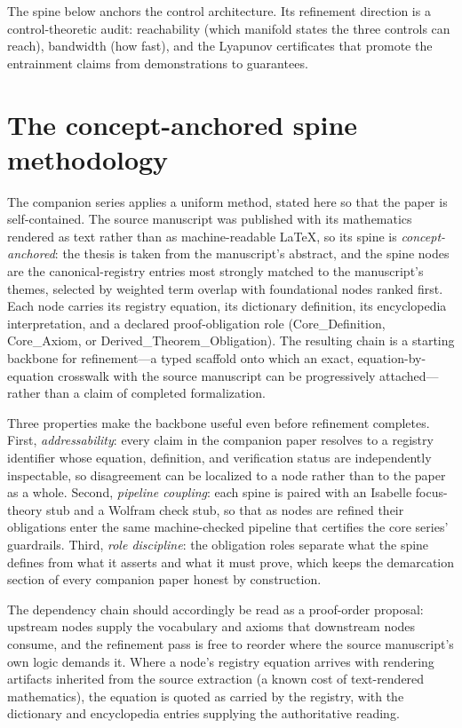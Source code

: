 \documentclass[11pt]{article}
\theoremstyle{remark}
\begin{document}
The spine below anchors the control architecture. Its refinement direction is a control-theoretic audit: reachability (which manifold states the three controls can reach), bandwidth (how fast), and the Lyapunov certificates that promote the entrainment claims from demonstrations to guarantees.

\section{The concept-anchored spine methodology}
\label{sec:method}

The companion series applies a uniform method, stated here so that the paper is self-contained. The source manuscript was published with its mathematics rendered as text rather than as machine-readable LaTeX, so its spine is \emph{concept-anchored}: the thesis is taken from the manuscript's abstract, and the spine nodes are the canonical-registry entries most strongly matched to the manuscript's themes, selected by weighted term overlap with foundational nodes ranked first. Each node carries its registry equation, its dictionary definition, its encyclopedia interpretation, and a declared proof-obligation role (Core\_Definition, Core\_Axiom, or Derived\_Theorem\_Obligation). The resulting chain is a starting backbone for refinement---a typed scaffold onto which an exact, equation-by-equation crosswalk with the source manuscript can be progressively attached---rather than a claim of completed formalization.

Three properties make the backbone useful even before refinement completes. First, \emph{addressability}: every claim in the companion paper resolves to a registry identifier whose equation, definition, and verification status are independently inspectable, so disagreement can be localized to a node rather than to the paper as a whole. Second, \emph{pipeline coupling}: each spine is paired with an Isabelle focus-theory stub and a Wolfram check stub, so that as nodes are refined their obligations enter the same machine-checked pipeline that certifies the core series' guardrails. Third, \emph{role discipline}: the obligation roles separate what the spine defines from what it asserts and what it must prove, which keeps the demarcation section of every companion paper honest by construction.

The dependency chain should accordingly be read as a proof-order proposal: upstream nodes supply the vocabulary and axioms that downstream nodes consume, and the refinement pass is free to reorder where the source manuscript's own logic demands it. Where a node's registry equation arrives with rendering artifacts inherited from the source extraction (a known cost of text-rendered mathematics), the equation is quoted as carried by the registry, with the dictionary and encyclopedia entries supplying the authoritative reading.
\end{document}
